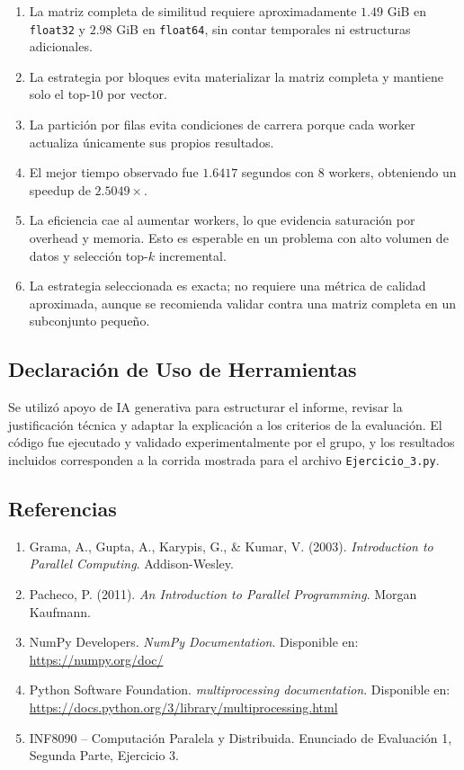 \documentclass[10pt,a4paper]{article}
\begin{document}
\begin{enumerate}
    \item La matriz completa de similitud requiere aproximadamente $1.49$ GiB
        en \texttt{float32} y $2.98$ GiB en \texttt{float64}, sin contar
        temporales ni estructuras adicionales.
    \item La estrategia por bloques evita materializar la matriz completa y
        mantiene solo el top-$10$ por vector.
    \item La partici\'on por filas evita condiciones de carrera porque cada
        worker actualiza \'unicamente sus propios resultados.
    \item El mejor tiempo observado fue $1.6417$ segundos con $8$ workers,
        obteniendo un speedup de $2.5049\times$.
    \item La eficiencia cae al aumentar workers, lo que evidencia saturaci\'on
        por overhead y memoria. Esto es esperable en un problema con alto volumen
        de datos y selecci\'on top-$k$ incremental.
    \item La estrategia seleccionada es exacta; no requiere una m\'etrica de
        calidad aproximada, aunque se recomienda validar contra una matriz
        completa en un subconjunto peque\~no.
\end{enumerate}

\subsection{Declaraci\'on de Uso de Herramientas}

Se utiliz\'o apoyo de IA generativa para estructurar el informe, revisar la
justificaci\'on t\'ecnica y adaptar la explicaci\'on a los criterios de la
evaluaci\'on. El c\'odigo fue ejecutado y validado experimentalmente por el
grupo, y los resultados incluidos corresponden a la corrida mostrada para el
archivo \texttt{Ejercicio\_3.py}.

\subsection{Referencias}

\begin{enumerate}
    \item Grama, A., Gupta, A., Karypis, G., \& Kumar, V. (2003).
    \textit{Introduction to Parallel Computing}. Addison-Wesley.
    \item Pacheco, P. (2011). \textit{An Introduction to Parallel Programming}.
    Morgan Kaufmann.
    \item NumPy Developers. \textit{NumPy Documentation}. Disponible en:
    \url{https://numpy.org/doc/}
    \item Python Software Foundation. \textit{multiprocessing documentation}.
    Disponible en: \url{https://docs.python.org/3/library/multiprocessing.html}
    \item INF8090 -- Computaci\'on Paralela y Distribuida. Enunciado de
    Evaluaci\'on 1, Segunda Parte, Ejercicio 3.
\end{enumerate}
\end{document}
